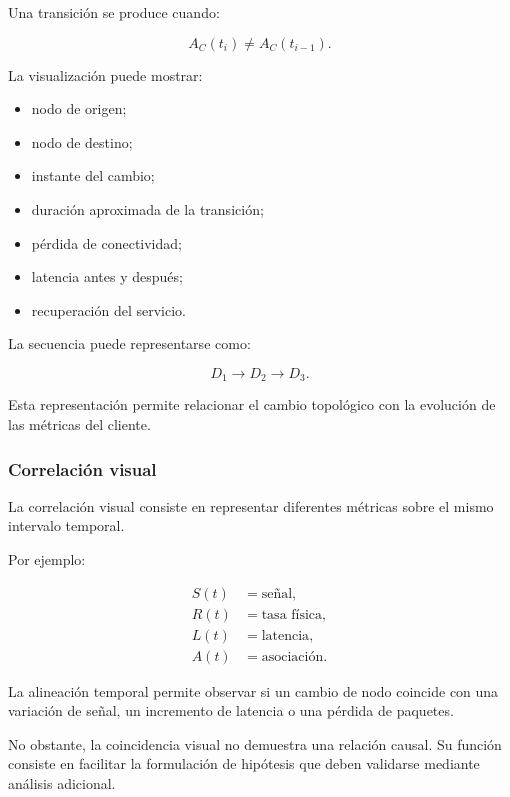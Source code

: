 Una transición se produce cuando:

\[
    A_C(t_i)
    \neq
    A_C(t_{i-1}).
\]

La visualización puede mostrar:

\begin{itemize}
    \item nodo de origen;

    \item nodo de destino;

    \item instante del cambio;

    \item duración aproximada de la transición;

    \item pérdida de conectividad;

    \item latencia antes y después;

    \item recuperación del servicio.
\end{itemize}

La secuencia puede representarse como:

\[
    D_1
    \longrightarrow
    D_2
    \longrightarrow
    D_3.
\]

Esta representación permite relacionar el cambio topológico con la
evolución de las métricas del cliente.


\subsubsection*{Correlación visual}

La correlación visual consiste en representar diferentes métricas sobre
el mismo intervalo temporal.

Por ejemplo:

\[
\begin{aligned}
    S(t)
    &=
    \text{señal},\\
    R(t)
    &=
    \text{tasa física},\\
    L(t)
    &=
    \text{latencia},\\
    A(t)
    &=
    \text{asociación}.
\end{aligned}
\]

La alineación temporal permite observar si un cambio de nodo coincide
con una variación de señal, un incremento de latencia o una pérdida de
paquetes.

No obstante, la coincidencia visual no demuestra una relación causal.
Su función consiste en facilitar la formulación de hipótesis que deben
validarse mediante análisis adicional.


